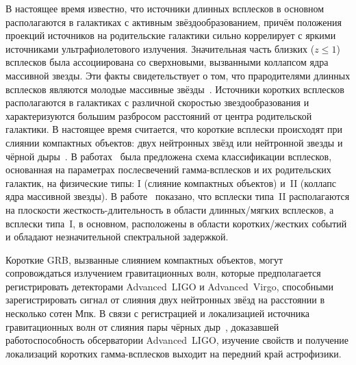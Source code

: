 В настоящее время известно, что источники длинных всплесков в основном располагаются в галактиках 
с активным звёздообразованием, причём положения проекций источников на родительские галактики сильно
коррелирует с яркими источниками ультрафиолетового излучения. Значительная часть 
близких ($z \le 1$) всплесков была ассоциирована со сверхновыми, вызванными 
коллапсом ядра массивной звезды.
Эти факты свидетельствует о том, что прародителями длинных всплесков являются молодые 
массивные звёзды~\citep{Berger_2014ARAA}.
Источники коротких всплесков располагаются в галактиках с различной скоростью 
звездообразования и характеризуются большим разбросом расстояний от центра родительской галактики. 
В настоящее время считается, что короткие всплески происходят при слиянии компактных 
объектов: двух нейтронных звёзд или нейтронной звезды и чёрной дыры~\citep{Berger_2014ARAA}.
В работах~\citep{Zhang_2006,Zhang_2009} была предложена схема классификации всплесков, 
основанная на параметрах послесвечений гамма-всплесков и их родительских галактик,
на физические типы: I (слияние компактных объектов) и~II (коллапс ядра массивной звезды). 
В работе~\citep{Zhang_2009} показано, 
что всплески типа~II располагаются на плоскости жесткость-длительность в области 
длинных/мягких всплесков, а всплески типа~I, в основном, расположены в области коротких/жестких 
событий и обладают незначительной спектральной задержкой.

Короткие GRB, вызванные слиянием компактных объектов, могут сопровождаться 
излучением гравитационных волн, которые предполагается регистрировать 
детекторами Advanced~LIGO и Advanced~Virgo, 
способными зарегистрировать сигнал от слияния двух нейтронных звёзд на расстоянии в несколько сотен Мпк. 
В связи с регистрацией и локализацией источника гравитационных
волн от слияния пары чёрных дыр~\citep{Abbott_2016PhRvL}, доказавшей работоспособность обсерватории 
Advanced~LIGO, изучение свойств и получение локализаций коротких гамма-всплесков 
выходит на передний край астрофизики.

